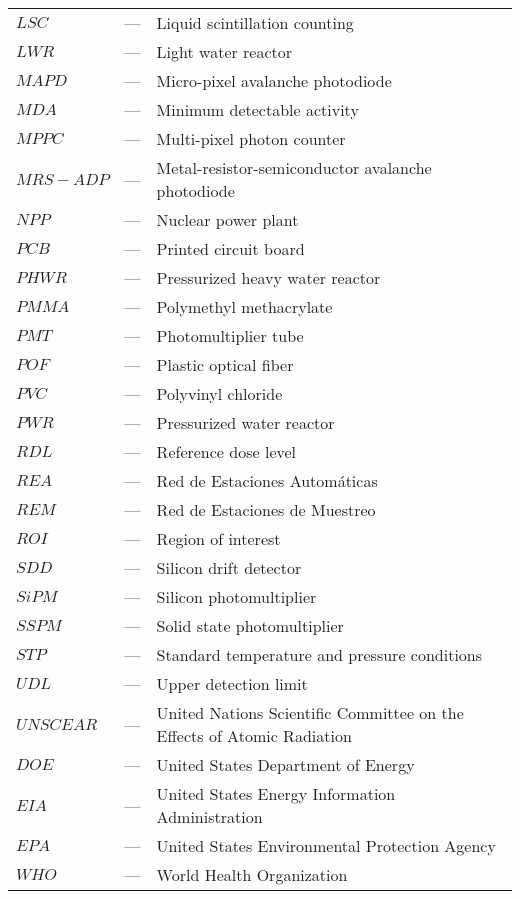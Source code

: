 \begin{longtable}{p{25mm} c p{120mm} }
$LSC$ & --- & Liquid scintillation counting\\
$LWR$ & --- & Light water reactor\\
$MAPD$ & --- & Micro-pixel avalanche photodiode\\
$MDA$ & --- & Minimum detectable activity\\
$MPPC$ & --- & Multi-pixel photon counter\\
$MRS-ADP$ & --- & Metal-resistor-semiconductor avalanche photodiode\\
$NPP$ & --- & Nuclear power plant\\
$PCB$ & --- & Printed circuit board\\
$PHWR$ & --- & Pressurized heavy water reactor\\
$PMMA$ & --- & Polymethyl methacrylate\\
$PMT$ & --- & Photomultiplier tube\\
$POF$ & --- & Plastic optical fiber\\
$PVC$ & --- & Polyvinyl chloride\\
$PWR$ & --- & Pressurized water reactor\\
$RDL$ & --- & Reference dose level\\
$REA$ & --- & Red de Estaciones Automáticas\\
$REM$ & --- & Red de Estaciones de Muestreo\\
$ROI$ & --- & Region of interest\\
$SDD$ & --- & Silicon drift detector\\
$SiPM$ & --- & Silicon photomultiplier\\
$SSPM$ & --- & Solid state photomultiplier\\
$STP$ & --- & Standard temperature and pressure conditions\\
$UDL$ & --- & Upper detection limit\\
$UNSCEAR$ & --- & United Nations Scientific Committee on the Effects
\newline
of Atomic Radiation\\
$DOE$ & --- & United States Department of Energy\\
$EIA$ & --- & United States Energy Information Administration\\
$EPA$ & --- & United States Environmental Protection Agency\\
$WHO$ & --- & World Health Organization\\


\end{longtable}

